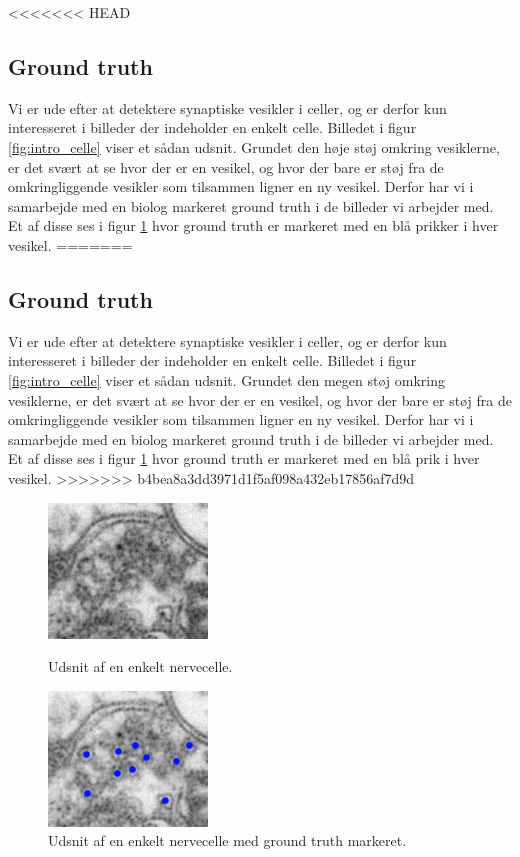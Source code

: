 <<<<<<< HEAD
\subsection{Ground truth}				
Vi er ude efter at detektere synaptiske vesikler i celler, og er derfor kun interesseret i billeder der indeholder en enkelt celle. Billedet i figur \ref{fig:intro_celle} viser et sådan udsnit. Grundet den høje støj omkring vesiklerne, er det svært at se hvor der er en vesikel, og hvor der bare er støj fra de omkringliggende vesikler som tilsammen ligner en ny vesikel. Derfor har vi i samarbejde med en biolog markeret ground truth i de billeder vi arbejder med. Et af disse ses i figur \ref{fig:intro_celle_groundtruth} hvor ground truth er markeret med en blå prikker i hver vesikel.
=======
\subsection{Ground truth}
Vi er ude efter at detektere synaptiske vesikler i celler, og er derfor kun interesseret i billeder der indeholder en enkelt celle. Billedet i figur \ref{fig:intro_celle} viser et sådan udsnit. Grundet den megen støj omkring vesiklerne, er det svært at se hvor der er en vesikel, og hvor der bare er støj fra de omkringliggende vesikler som tilsammen ligner en ny vesikel. Derfor har vi i samarbejde med en biolog markeret ground truth i de billeder vi arbejder med. Et af disse ses i figur \ref{fig:intro_celle_groundtruth} hvor ground truth er markeret med en blå prik i hver vesikel.
>>>>>>> b4bea8a3dd3971d1f5af098a432eb17856af7d9d

\begin{figure}[H]
	\begin{minipage}[b]{0.5\linewidth}
		\centering
		\includegraphics[scale=1.5]{files/intro/img/celle.png}
		\caption{Udsnit af en enkelt nervecelle.\label{fig:intro_celle}}
	\end{minipage}
	\hspace{0.5cm}
	\begin{minipage}[b]{0.5\linewidth}
		\centering
		\includegraphics[scale=1.5]{files/intro/img/celle_groundtruth.png}
		\caption{Udsnit af en enkelt nervecelle med ground truth markeret.\label{fig:intro_celle_groundtruth}}
	\end{minipage}
\end{figure}
  

